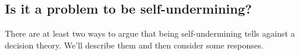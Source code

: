 \documentclass[a4paper,final]{article}
\newenvironment{CCM rewritten}
{\begingroup\color{blue}} %
{\endgroup}              %
\begin{document}




%


\subsection{Is it a problem to be self-undermining?}\label{sect:reu:phil-discussion}

There are at least two ways to argue that being self-undermining tells against a decision theory. We'll describe them and then consider some responses.
\end{document}

